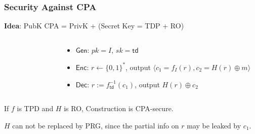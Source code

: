 \begin{frame}\frametitle{Security Against CPA}
\textbf{Idea}: PubK CPA = PrivK + (Secret Key = TDP + RO)
\begin{columns}[t]
\begin{column}{5cm}
\begin{figure}[t]
\begin{center}

\end{center}
\end{figure}\end{column}
\begin{column}{5cm}
\begin{construction}
\begin{itemize}
\item $\mathsf{Gen}$: $pk =  I $, $sk = \mathsf{td} $
\item $\mathsf{Enc}$: $r \gets \{0,1\}^*$, output $\langle c_{1}=f_I(r), c_{2}=H(r)\oplus m\rangle$
\item $\mathsf{Dec}$: $r := f_{\mathsf{td}}^{-1}(c_1)$, output $H(r)\oplus c_2$
\end{itemize}
\end{construction}
\end{column}
\end{columns}
\begin{theorem}
If $f$ is TPD and $H$ is RO, Construction is CPA-secure.
\end{theorem}
\alert{$H$ can not be replaced by PRG, since the partial info on $r$ may be leaked by $c_1$.}
\end{frame}

